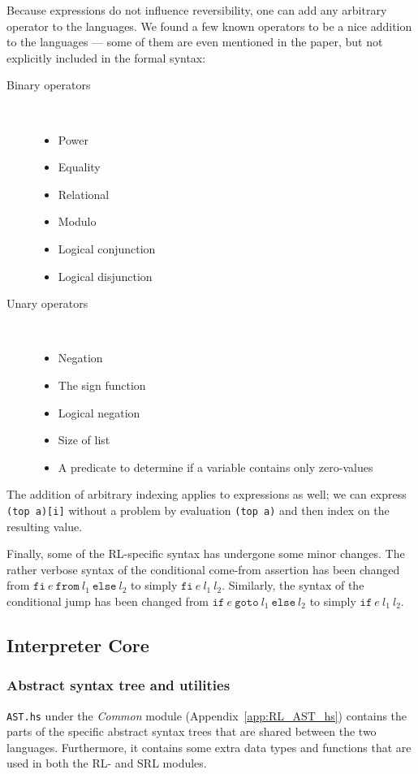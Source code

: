 Because expressions do not influence reversibility, one can add any arbitrary operator to the languages. We found a few known operators to be a nice addition to the languages --- some of them are even mentioned in the paper, but not explicitly included in the formal syntax:
\begin{description}
\item[Binary operators]~
  \begin{itemize}
  \item Power
  \item Equality
  \item Relational
  \item Modulo
  \item Logical conjunction
  \item Logical disjunction
\end{itemize}
\item[Unary operators]~
\begin{itemize}
  \item Negation
  \item The sign function
  \item Logical negation
  \item Size of list
  \item A predicate to determine if a variable contains only zero-values
\end{itemize}
\end{description}

The addition of arbitrary indexing applies to expressions as well; we can express \texttt{(top a)[i]} without a problem by evaluation \texttt{(top a)} and then index on the resulting value.

Finally, some of the RL-specific syntax has undergone some minor changes. The rather verbose syntax of the conditional come-from assertion has been changed from $\texttt{fi} \ e \ \texttt{from} \ l_1 \ \texttt{else} \ l_2$ to simply $\texttt{fi} \ e \ l_1 \ l_2$. Similarly, the syntax of the conditional jump has been changed from $\texttt{if} \ e \ \texttt{goto} \ l_1 \ \texttt{else} \ l_2$ to simply $\texttt{if} \ e \ l_1 \ l_2$.

\subsection{Interpreter Core}

\subsubsection{Abstract syntax tree and utilities}
\texttt{AST.hs} under the \textit{Common} module (Appendix~\ref{app:RL_AST_hs}) contains the parts of the specific abstract syntax trees that are shared between the two languages. Furthermore, it contains some extra data types and functions that are used in both the RL- and SRL modules.

